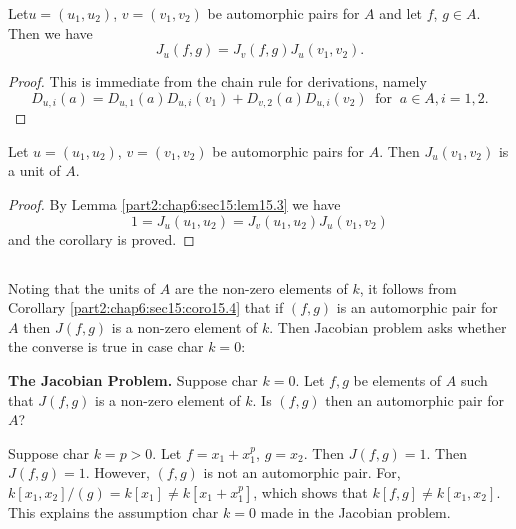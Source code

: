 \begin{lemma}\label{part2:chap6:sec15:lem15.3}
  Let\pageoriginale $u= (u_1, u_2)$, $v= (v_1, v_2)$ be automorphic pairs for $A$
  and let $f$, $g \in A$. Then we have
  $$
  J_{u}(f, g)= J_v (f, g) J_u (v_1, v_2). 
  $$
\end{lemma}

\begin{proof}
  This is immediate from the chain rule for derivations, namely 
  $$
  D_{u,i}(a)=D_{u, 1} (a) D_{u, i} (v_1)+ D_{v, 2}(a) D_{u, i} (v_2) ~
  \text{ for }~ a \in A, i=1,2.
  $$
\end{proof}

\begin{coro}\label{part2:chap6:sec15:coro15.4}
  Let $u= (u_1, u_2)$, $v= (v_1, v_2)$ be automorphic pairs for
  $A$. Then $J_u (v_1, v_2)$ is a unit of $A$.
\end{coro}

\begin{proof}
  By Lemma \ref{part2:chap6:sec15:lem15.3} we have
  $$
  1= J_u (u_1, u_2)= J_{v}(u_1, u_2) J_u (v_1, v_2)
  $$
  and the corollary is proved.
\end{proof}

\setcounter{subsection}{4}
\subsection{}\label{part2:chap6:sec15:ss15.5}

Noting that the units of $A$ are the non-zero elements of $k$, it
follows from Corollary \ref{part2:chap6:sec15:coro15.4} that if $(f,
g)$ is an automorphic pair for $A$ then $J(f, g)$ is a non-zero
element of $k$. Then Jacobian problem asks whether the converse is
true in case char $k=0$:

\noindent \textbf{The Jacobian Problem.} Suppose char $k=0$. Let $f,
g$ be elements of $A$ such that $J(f, g)$ is a non-zero element of
$k$. Is $(f, g)$ then an automorphic pair for $A$?

\setcounter{thm}{5}
\begin{remark}\label{part2:chap6:sec15:rem15.6}
  Suppose char $k=p > 0$. Let $f = x_1 + x_1^p$, $g= x_2$. Then $J(f,
  g)=1$. Then $J(f, g)=1$. However, $(f, g)$ is not an
  automorphic pair. For, $k[x_1, x_2]/(g)=k[x_1]\neq k[x_1 + x_1^p]$,
  which shows that $k[f, g]\neq k[x_1, x_2]$. This explains the
  assumption char $k=0$ made in the Jacobian problem.
\end{remark}

